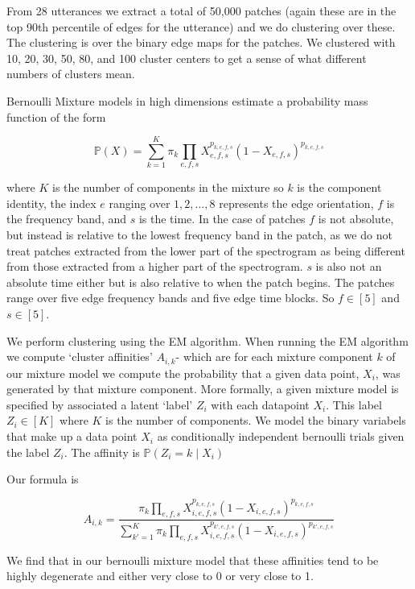 \documentclass[11pt]{article}
\begin{document}
 
   From 28 utterances we extract a total of 50,000 patches (again
   these are in the top 90th percentile of edges for the utterance)
   and we do clustering over these.  The clustering is over the binary
   edge maps for the patches.  We clustered with 10, 20, 30, 50, 80,
   and 100 cluster centers to get a sense of what different numbers of
   clusters mean.

   Bernoulli Mixture models in high dimensions estimate a probability mass
   function of the form

   $$\mathbb{P}(X) = \sum_{k=1}^K \pi_k \prod_{e,f,s} X_{e,f,s}^{p_{k,e,f,s}} (1-X_{e,f,s})^{p_{k,e,f,s}}   $$

   where $K$ is the number of components in the mixture so $k$ is the
   component identity, the index $e$ ranging over ${1,2,\ldots,8}$
   represents the edge orientation, $f$ is the frequency band, and $s$
   is the time.  In the case of patches $f$ is not absolute, but
   instead is relative to the lowest frequency band in the patch, as
   we do not treat patches extracted from the lower part of the
   spectrogram as being different from those extracted from a higher
   part of the spectrogram.  $s$ is also not an absolute time either
   but is also relative to when the patch begins. The patches range
   over five edge frequency bands and five edge time blocks. So $f\in [ 5 ]$
   and $s\in [ 5 ]$.

   We perform clustering using the EM algorithm.  When running the EM
   algorithm we compute `cluster affinities' $A_{i,k}$- which are for
   each mixture component $k$ of our mixture model we compute the
   probability that a given data point, $X_i$, was generated by that
   mixture component.  More formally, a given mixture model is
   specified by associated a latent `label' $Z_i$ with each datapoint
   $X_i$.  This label $Z_i\in [K]$ where $K$ is the number of
   components.  We model the binary variabels that make up a data
   point $X_i$ as conditionally independent bernoulli trials given the
   label $Z_i$.  The affinity is $\mathbb{P}(Z_i = k\mid X_i)$

   Our formula is

   $$ A_{i,k} =\frac{\pi_k\prod_{e,f,s} X_{i,e,f,s}^{p_{k,e,f,s}} (1-X_{i,e,f,s})^{p_{k,e,f,s}}  }
   {\sum_{k'=1}^K \pi_k\prod_{e,f,s} X_{i,e,f,s}^{p_{k',e,f,s}} (1-X_{i,e,f,s})^{p_{k',e,f,s}}  }$$

   We find that in our bernoulli mixture model that these affinities tend to be highly degenerate and either very close to 0
   or very close to 1.
\end{document}
